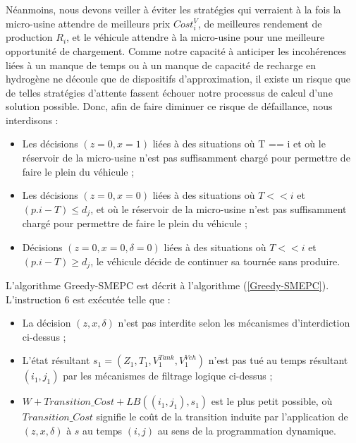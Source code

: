 Néanmoins, nous devons veiller à éviter les stratégies qui verraient à la fois la micro-usine attendre de meilleurs prix $Cost^V_i$, de meilleures rendement de production $R_i$, et le véhicule attendre à la micro-usine pour une meilleure opportunité de chargement. Comme notre capacité à anticiper les incohérences liées à un manque de temps ou à un manque de capacité de recharge en hydrogène ne découle que de dispositifs d'approximation, il existe un risque que de telles stratégies d'attente fassent échouer notre processus de calcul d'une solution possible. Donc, afin de faire diminuer ce risque de défaillance, nous interdisons :
\begin{itemize}[label=$\square$]
	\item Les décisions $(z = 0, x = 1)$ liées à des situations où T == i et où le réservoir de la micro-usine n'est pas suffisamment chargé pour permettre de faire le plein du véhicule ; 
	\item Les décisions $(z = 0, x = 0)$ liées à des situations où $T << i$ et $(p.i - T) \leq d_j$, et où le réservoir de la micro-usine n'est pas suffisamment chargé pour permettre de faire le plein du véhicule ; 
	\item Décisions $(z = 0, x = 0, \delta= 0)$ liées à des situations où $T << i$ et $(p.i - T) \geq d_j$, le véhicule décide de continuer sa tournée sans produire.
\end{itemize}
L'algorithme Greedy-SMEPC est décrit à l'algorithme (\ref{Greedy-SMEPC}). L'instruction 6 est exécutée telle que :
\begin{itemize}[label=$\square$]
	\item La décision $(z, x, \delta)$ n'est pas interdite selon les mécanismes d'interdiction ci-dessus ;
	\item L'état résultant $s_1 = (Z_1, T_1, V^{Tank}_1,V^{Veh}_1)$ n'est pas tué au temps résultant $(i_1, j_1)$ par les mécanismes de filtrage logique ci-dessus ;
	\item $W + Transition\_Cost + LB((i_1, j_1), s_1)$ est le plus petit possible, où $Transition\_Cost$ signifie le coût de la transition induite par l'application de $(z, x, \delta)$ à $s$ au temps $(i, j)$ au sens de la programmation dynamique.
\end{itemize}

